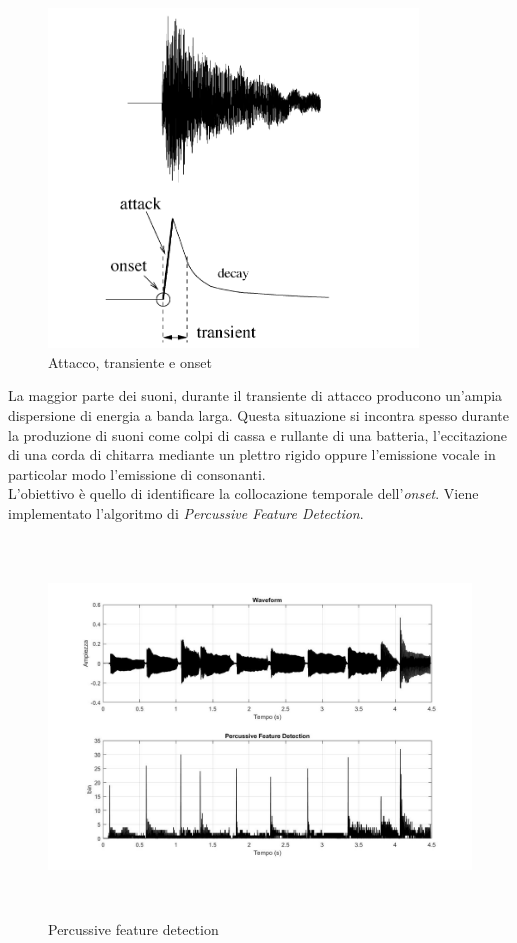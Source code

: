 \documentclass[12pt]{report}
\begin{document}
\begin{figure}[htbp]
\centerline{\includegraphics[height=90mm]{img/onset}}
\caption{Attacco, transiente e onset}
\label{fig:onset}
\end{figure}		

La maggior parte dei suoni, durante il transiente di attacco producono un'ampia dispersione di energia a banda larga. Questa situazione si incontra spesso durante la produzione di suoni come colpi di cassa e rullante di una batteria, l'eccitazione di una corda di chitarra mediante un plettro rigido oppure l'emissione vocale in particolar modo l'emissione di consonanti.\\
L'obiettivo è quello di identificare la collocazione temporale dell'{\itshape onset}. Viene implementato l'algoritmo di {\itshape Percussive Feature Detection}.\\

\begin{figure}[htbp]
\centerline{\includegraphics[height=100mm]{img/pfd}}
\caption{Percussive feature detection}
\label{fig:pfd}
\end{figure}
\end{document}

